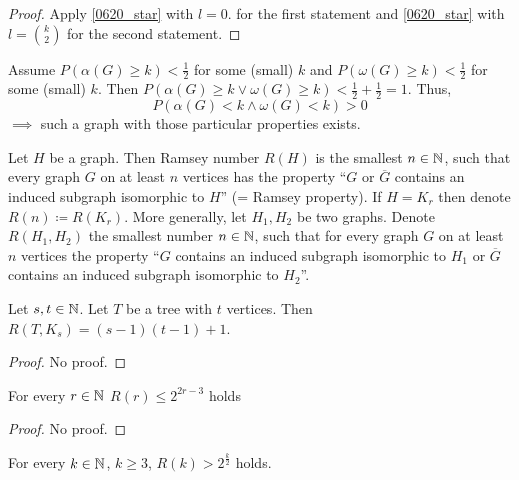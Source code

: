 \documentclass[aagt.tex]{subfiles}
\begin{document}
\begin{proof}
  Apply \ref{0620_star} with $l=0$. for the first statement and \ref{0620_star} with $l = {k \choose 2}$ for the second statement.
\end{proof}

Assume $P(\alpha(G) \geq k) < \frac{1}{2}$ for some (small) $k$ and $P(\omega(G) \geq k) < \frac{1}{2}$ for some (small) $k$.
Then $P(\alpha(G) \geq k \vee \omega(G) \geq k) < \frac{1}{2} + \frac{1}{2} = 1$.
Thus,
\[ P(\alpha(G) < k \wedge \omega(G) < k) > 0 \]
$\implies$ such a graph with those particular properties exists.

\begin{defi*}
  Let $H$ be a graph. Then Ramsey number $R(H)$ is the smallest $n \in \mathbb{N}$, such that every graph $G$ on at least $n$ vertices has the property 
  \enquote{$G$ or $\overbar{G}$ contains an induced subgraph isomorphic to $H$} (= Ramsey property).
  If $H = K_r$ then denote $R(n) \coloneqq R(K_r)$.
  More generally, let $H_1,H_2$ be two graphs.
  Denote $R(H_1, H_2)$ the smallest number $n \in \mathbb{N}$, such that for every graph $G$ on at least $n$ vertices the property 
  \enquote{$G$ contains an induced subgraph isomorphic to $H_1$ or $\overbar{G}$ contains an induced subgraph isomorphic to $H_2$}.
\end{defi*}

\begin{prop}[7.3]
  Let $s,t \in \mathbb{N}$. Let $T$ be a tree with $t$ vertices.
  Then $R(T,K_s) = (s-1)(t-1)+1$.
\end{prop}

\begin{proof}
  No proof.
\end{proof}

\begin{theorem}\label{7.4-theorem}
  For every $r \in \mathbb{N}$ $R(r) \leq 2^{2r-3}$ holds
\end{theorem}

\begin{proof}
  No proof.
\end{proof}

\begin{theorem}[Erdös 1947]\label{7.5-theorem}
  For every $k \in \mathbb{N}$, $k \geq 3$, $R(k) > 2^{\frac{k}{2}}$ holds.
\end{theorem}
\end{document}
